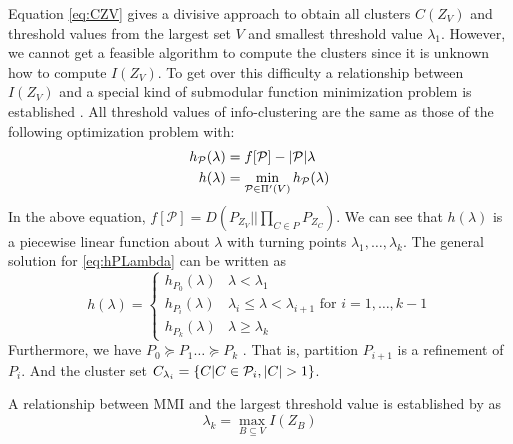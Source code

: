 Equation \eqref{eq:CZV} gives a divisive approach to obtain all clusters $C(Z_V)$ and threshold values from
the largest set $V$ and smallest threshold value $\lambda_1$. However, we cannot get a feasible algorithm
to compute the clusters since it is unknown how to compute $I(Z_V)$.
To get over this difficulty a relationship between $I(Z_V)$ and
a special kind of submodular function minimization problem is established \citep{mac}. All threshold values of info-clustering are the same as those of
the following optimization problem with:
\begin{align}\label{eq:hPLambda}
h_{\mathcal{P}}(\lambda) &= f[\mathcal{P}] - |\mathcal{P}| \lambda \notag\\
h(\lambda) &= \min_{\mathcal{P} \in \Pi'(V)}h_{\mathcal{P}}(\lambda)
\end{align}
In the above equation, $f[\mathcal{P}]=D(P_{Z_V} || \prod_{C\in P}P_{Z_C})$. We can see that $h(\lambda)$ is a piecewise linear function about $\lambda$ with turning points
$\lambda_1, \dots, \lambda_{k}$. The general solution for \eqref{eq:hPLambda} can be written as
\begin{equation}\label{eq:PSP_structure}
h(\lambda) = \begin{cases} h_{P_0}(\lambda) & \lambda < \lambda_1 \\
h_{P_i}(\lambda) & \lambda_i \leq \lambda < \lambda_{i+1} \textrm{ for } i = 1, \dots, k-1 \\
h_{P_k}(\lambda) & \lambda \geq \lambda_k
\end{cases}
\end{equation}
Furthermore, we have $P_0 \succeq P_1 \dots \succeq P_k$ \citep{narayanan}. That is, partition $P_{i+1}$ is a refinement of $P_i$.
And the cluster set $C_{\lambda_i} =\{C | C\in \mathcal{P}_i, \lvert C\rvert > 1\}$.

A relationship between MMI and the largest threshold value is established by \citet{agg_ic} as 
\begin{equation}\label{eq:largest_threshold}
\lambda_k = \max_{B\subseteq V} I(Z_B)
\end{equation}
